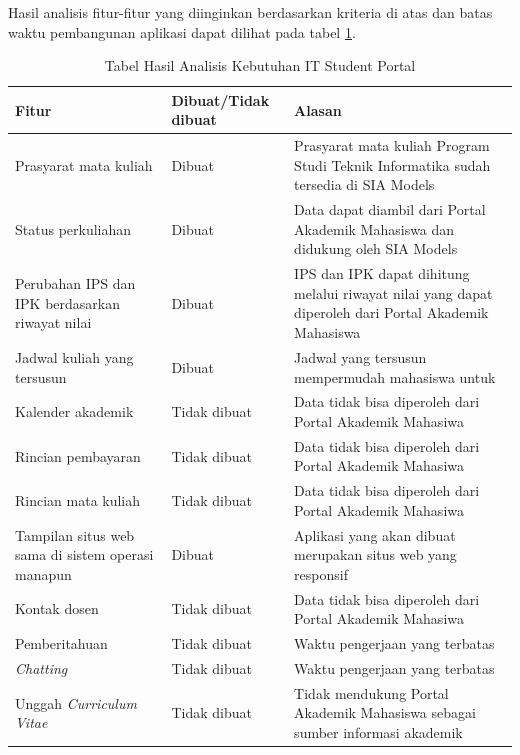 Hasil analisis fitur-fitur yang diinginkan berdasarkan kriteria di atas dan batas waktu pembangunan aplikasi dapat dilihat pada tabel \ref{tab:3_hasil_fitur}.
\begin{table}
	\centering
    \begin{tabular}{|l|l|l|}
		\hline
		Fitur & Dibuat/Tidak dibuat & Alasan\\
		\hline
		Prasyarat mata kuliah                             & Dibuat       & Prasyarat mata kuliah Program Studi Teknik Informatika sudah tersedia di SIA Models                   \\
    Status perkuliahan                                & Dibuat       & Data dapat diambil dari Portal Akademik Mahasiswa dan didukung oleh SIA Models                        \\
    Perubahan IPS dan IPK berdasarkan riwayat nilai   & Dibuat       &  IPS dan IPK dapat dihitung melalui riwayat nilai yang dapat diperoleh dari Portal Akademik Mahasiswa \\
    Jadwal kuliah yang tersusun                       & Dibuat       & Jadwal yang tersusun mempermudah mahasiswa untuk                                                      \\
    Kalender akademik                                 & Tidak dibuat & Data tidak bisa diperoleh dari Portal Akademik Mahasiwa                                               \\
    Rincian pembayaran                                & Tidak dibuat & Data tidak bisa diperoleh dari Portal Akademik Mahasiwa                                               \\
    Rincian mata kuliah                               & Tidak dibuat & Data tidak bisa diperoleh dari Portal Akademik Mahasiwa                                               \\
    Tampilan situs web sama di sistem operasi manapun & Dibuat       & Aplikasi yang akan dibuat merupakan situs web yang responsif                                          \\
    Kontak dosen                                      & Tidak dibuat & Data tidak bisa diperoleh dari Portal Akademik Mahasiwa                                               \\
    Pemberitahuan                                     & Tidak dibuat & Waktu pengerjaan yang terbatas                                                                        \\
    \textit{Chatting}                                          & Tidak dibuat & Waktu pengerjaan yang terbatas                                                                        \\
    Unggah \textit{Curriculum Vitae}                           & Tidak dibuat & Tidak mendukung Portal Akademik Mahasiswa sebagai sumber informasi akademik                           \\
		\hline
		\end{tabular}
		\caption{Tabel Hasil Analisis Kebutuhan IT Student Portal}
	\label{tab:3_hasil_fitur}
\end{table}


